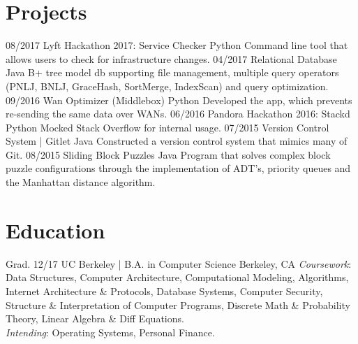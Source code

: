 \documentclass[]{friggeri-cv}
\begin{document}
\section{Projects}
\begin{entrylist}
 \entry
    {08/2017}
    {Lyft Hackathon 2017: Service Checker}
    {Python}
    {Command line tool that allows users to check for infrastructure changes.}
  \entry
    {04/2017}
    {Relational Database}
    {Java}
    {B+ tree model db supporting file management, multiple query operators (PNLJ, BNLJ, GraceHash, SortMerge, IndexScan) and query optimization.}
  \entry
    {09/2016}
    {Wan Optimizer (Middlebox)}
    {Python}
    {Developed the app, which prevents re-sending the same data over WANs.}
  \entry
    {06/2016}
    {Pandora Hackathon 2016: Stackd}
    {Python}
    {Mocked Stack Overflow for internal usage.}
  \entry
    {07/2015}
    {Version Control System | Gitlet}
    {Java}
    {Constructed a version control system that mimics many of Git.}
  \entry
    {08/2015}
    {Sliding Block Puzzles}
    {Java}
    {Program that solves complex block puzzle configurations through the implementation of ADT’s, priority queues and the Manhattan distance algorithm.}
\end{entrylist}
\section{Education}
\begin{entrylist}
  \entry
    {Grad. 12/17}
    {UC Berkeley | B.A. in Computer Science}
    {Berkeley, CA}
    {\emph{Coursework}: Data Structures, Computer Architecture, Computational Modeling, Algorithms, Internet Architecture \& Protocols, Database Systems, Computer Security, Structure \& Interpretation of Computer Programs, Discrete Math \& Probability Theory, Linear Algebra \& Diff Equations.\\
    \emph{Intending}: Operating Systems, Personal Finance.}
\end{entrylist}
\end{document}
